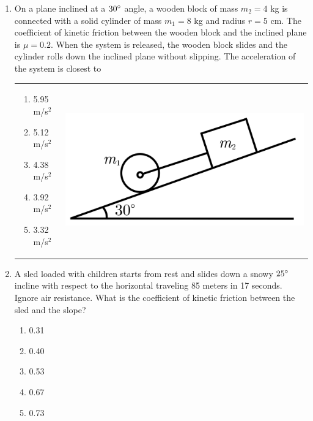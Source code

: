 \documentclass[12pt,letterpaper]{article}
\begin{document}
\begin{enumerate}[resume]
\item
On a plane inclined at a $30\degree$ angle, a wooden block of mass $m_2 = 4$ kg is connected with a solid cylinder of mass $m_1 = 8$ kg and radius $r = 5$ cm. The coefficient of kinetic friction between the wooden block and the inclined plane is $\mu = 0.2$. When the system is released, the wooden block slides and the cylinder rolls down the inclined plane without slipping. The acceleration of the system is closest to

\begin{tabular}{l r}

\begin{minipage}{0.6\textwidth}
\begin{enumerate}
\item 5.95 m/s$^2$
\item 5.12 m/s$^2$
\item 4.38 m/s$^2$
\item 3.92 m/s$^2$
\item 3.32 m/s$^2$
\end{enumerate}
\end{minipage} &
\begin{minipage}{0.3\textwidth}
\includegraphics[width=\textwidth]{cylinder.png}
\end{minipage}
\end{tabular}

\item
A sled loaded with children starts from rest and slides down a snowy $25\degree$ incline with respect to the horizontal traveling 85 meters in 17 seconds. Ignore air resistance. What is the coefficient of kinetic friction between the sled and the slope?
\begin{enumerate}
\item 0.31
\item 0.40
\item 0.53
\item 0.67
\item 0.73
\end{enumerate}
\end{enumerate}
\end{document}
